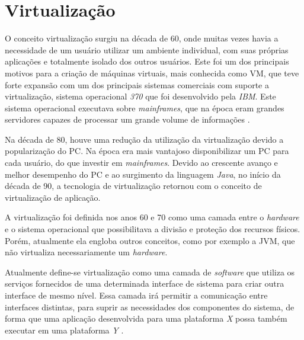 \chapter{Virtualização}
\label{cap:virtualizacao}

O conceito virtualização surgiu na década de 60, onde muitas vezes havia a necessidade de um usuário utilizar um ambiente individual, 
com suas próprias aplicações e totalmente isolado dos outros usuários. Este foi um dos principais motivos para a criação de máquinas 
virtuais, mais conhecida como \ac{VM}, que teve forte expansão com um dos principais sistemas comerciais com suporte a virtualização, 
sistema operacional \textit{370} que foi desenvolvido pela \textit{IBM}. Este sistema operacional executava sobre \textit{mainframes}, 
que na época eram grandes servidores capazes de processar um grande volume de informações \cite{laureano2008}. 

Na década de 80, houve uma redução da utilização da virtualização devido a popularização do \ac{PC}. Na época era mais vantajoso disponibilizar 
um \ac{PC} para cada usuário, do que investir em \textit{mainframes}. Devido ao crescente avanço e melhor desempenho do \ac{PC} e
ao surgimento da linguagem \textit{Java}, no início da década de 90, a tecnologia de virtualização retornou com o conceito de virtualização
de aplicação.

A virtualização foi definida nos anos 60 e 70 como uma camada entre o \textit{hardware} e o sistema operacional que possibilitava a 
divisão e proteção dos recursos físicos. Porém, atualmente ela engloba outros conceitos, como por exemplo a \ac{JVM}, que não virtualiza
necessariamente um \textit{hardware}. 

Atualmente define-se virtualização como uma camada de \textit{software} que utiliza os serviços fornecidos de uma determinada interface de 
sistema para criar outra interface de mesmo nível. Essa camada irá permitir a comunicação entre interfaces distintas, para suprir as 
necessidades dos componentes do sistema, de forma que uma aplicação desenvolvida para uma plataforma \textit{X} possa também executar 
em uma plataforma \textit{Y} \cite{laureano2008}.

